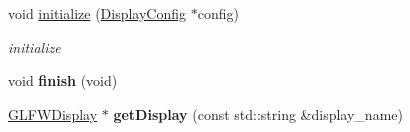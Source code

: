 \begin{DoxyCompactItemize}
\item 
void \hyperlink{classEngine_1_1DisplayManager_a2034225de0736f0e744ea1505f64077f}{initialize} (\hyperlink{classEngine_1_1DisplayConfig}{Display\+Config} $\ast$config)
\begin{DoxyCompactList}\small\item\em initialize \end{DoxyCompactList}\item 
\hypertarget{classEngine_1_1DisplayManager_afad79bba02480072eaf9fdf88f7e0172}{}void {\bfseries finish} (void)\label{classEngine_1_1DisplayManager_afad79bba02480072eaf9fdf88f7e0172}

\item 
\hypertarget{classEngine_1_1DisplayManager_a1bc6ee2cd4083b18548bfaa33a95733f}{}\hyperlink{classEngine_1_1GLFWDisplay}{G\+L\+F\+W\+Display} $\ast$ {\bfseries get\+Display} (const std\+::string \&display\+\_\+name)\label{classEngine_1_1DisplayManager_a1bc6ee2cd4083b18548bfaa33a95733f}


\end{DoxyCompactItemize}
